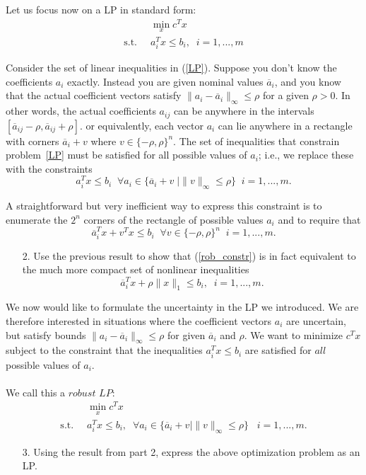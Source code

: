 \documentclass[11pt]{article}
\begin{document}
Let us focus now on a LP in standard form:
\begin{align}
    &\min_x c^Tx \nonumber \\
    \label{LP}
    \text{s.t.} \; \; &a_i^Tx \leq b_i, \; \; i = 1,...,m
\end{align}

Consider the set of linear inequalities in (\ref{LP}). Suppose you don't know the coefficients $a_i$ exactly. Instead you are given nominal values $\overline{a}_i$, and you know that the actual coefficient vectors satisfy $\|a_i - \overline{a}_i\|_{\infty} \leq \rho $ for a given $\rho > 0$. In other words, the actual coefficients $a_{ij}$ can be anywhere in the intervals $[\overline{a}_{ij} - \rho, \overline{a}_{ij} + \rho]$.  or equivalently, each vector $a_i$ can lie anywhere in a rectangle with corners $\overline{a}_i + v$ where $v \in \{-\rho, \rho\}^n$. The set of inequalities that constrain problem~\ref{LP} must be satisfied for all possible values of $a_i$; i.e., we replace these with the constraints
    \begin{equation}
    \label{rob_constr}
           a_i^Tx \leq b_i \; \; \forall a_i \in \{\overline{a}_i + v \; \mid \|v\|_{\infty} \leq \rho \} \; \;  i = 1, ..., m.
    \end{equation}

    A straightforward but very inefficient way to express this constraint is to enumerate the $2^n$ corners of the rectangle of possible values $a_i$ and to require that
    \[
    \overline{a}_i^Tx + v^Tx \leq b_i \; \; \forall v \in \{-\rho, \rho\}^n \; \; i = 1, ..., m.
    \]

    \begin{enumerate}
    \item[2.]
    Use the previous result to show that (\ref{rob_constr}) is in fact equivalent to the much more compact set of nonlinear inequalities
    \[
        \overline{a}_i^Tx + \rho\|x\|_1 \leq b_i, \; \; i = 1,...,m.
    \]

    \end{enumerate}

    We now would like to formulate the uncertainty in the LP we introduced. We are therefore interested in situations where the coefficient vectors $a_i$ are uncertain, but satisfy bounds $\|a_i - \overline{a}_i\|_{\infty} \leq \rho$  for given $\overline{a}_i$ and $\rho$. We want to minimize $c^Tx$ subject to the constraint that the inequalities $a_i^Tx \leq b_i$ are satisfied for $\textit{all}$ possible values of $a_i$. \\ \\
    We call this a $\textit{robust LP}:$
    \begin{align}
    &\min_x c^Tx \nonumber \\
    \label{RLP}
    \text{s.t.} \; \;  &a_i^Tx \leq b_i, \; \; \forall a_i \in \{ \overline{a}_i + v \mid \|v\|_{\infty} \leq \rho \} \; \; \; i = 1,...,m.
\end{align}

\begin{enumerate}
    \item[3.] Using the result from part 2, express the above optimization problem as an LP.

\end{enumerate}

\begin{solution}
\end{solution}
\end{document}
